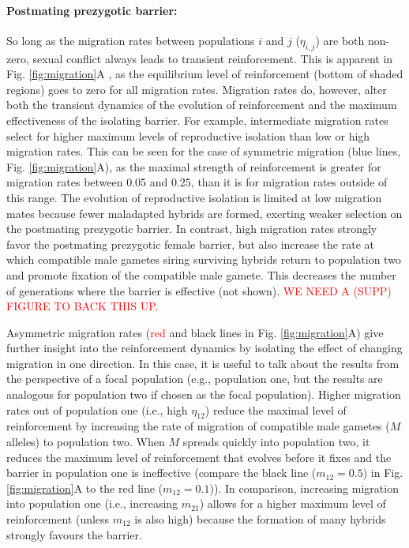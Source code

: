 \documentclass[11pt]{article}
\begin{document}
\paragraph{Postmating prezygotic barrier:} So long as the migration rates between populations $i$ and $j$ ($\eta_{{i,j}}$) are both non-zero, sexual conflict always leads to transient reinforcement.  
This is apparent in Fig. \ref{fig:migration}A , as the equilibrium level of reinforcement (bottom of shaded regions) goes to zero for all migration rates. 
Migration rates do, however, alter both the transient dynamics of the evolution of reinforcement and the maximum effectiveness of the isolating barrier.  
For example, intermediate migration rates select for higher maximum levels of reproductive isolation than low or high migration rates. 
This can be seen for the case of symmetric migration (blue lines, Fig. \ref{fig:migration}A), as the maximal strength of reinforcement is greater for migration rates between 0.05 and 0.25, than it is for migration rates outside of this range.  
The evolution of reproductive isolation is limited at low migration mates because fewer maladapted hybrids are formed, exerting weaker selection on the postmating prezygotic barrier. 
In contrast, high migration rates strongly favor the postmating prezygotic female barrier, but also increase the rate at which compatible male gametes siring surviving hybrids return to population two and promote fixation of the compatible male gamete.  
This decreases the number of generations where the barrier is effective (not shown).  \textcolor{red}{WE NEED A (SUPP) FIGURE  TO BACK THIS UP.}

 Asymmetric migration rates (\textcolor{red}{red} and black lines in Fig. \ref{fig:migration}A) give further insight into the reinforcement dynamics by isolating the effect of changing migration in one direction. 
In this case, it is useful to talk about the results from the perspective of a focal population (e.g., population one, but the results are analogous for population two if chosen as the focal population). 
Higher migration rates out of population one (i.e., high $\eta_{12}$) reduce the maximal level of reinforcement by increasing the rate of migration of compatible male gametes ($M$ alleles) to population two.  
When $M$  spreads quickly into population two, it reduces the maximum level of reinforcement that evolves before it fixes and the barrier in population one is ineffective (compare the black line ($m_{12}  = 0.5$) in Fig. \ref{fig:migration}A to the red line ($m_{12} = 0.1$)). 
In comparison, increasing migration into population one (i.e., increasing $m_{21}$) allows for a higher maximum level of reinforcement (unless $m_{12}$ is also high) because the formation of many hybrids strongly favours the barrier. 
\end{document}
